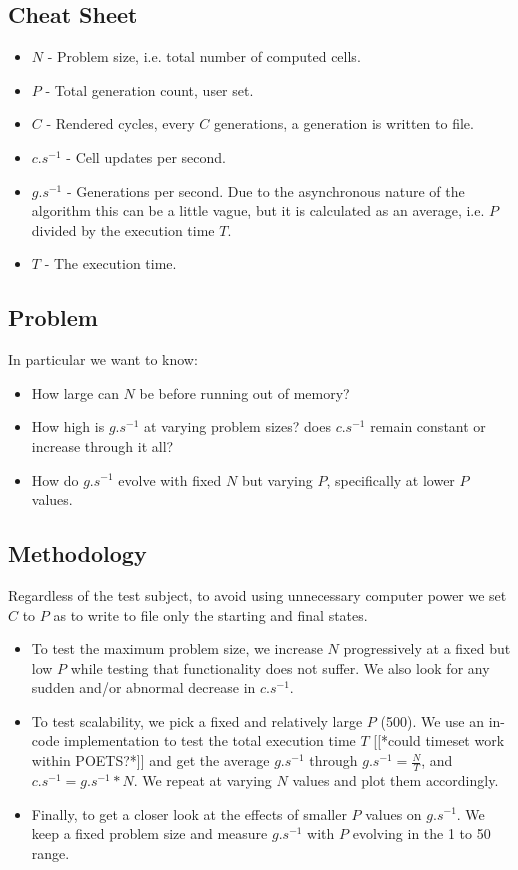 \documentclass[a4paper]{article}
\begin{document}
\subsection*{Cheat Sheet}
\begin{itemize}
    \item $N$ - Problem size, i.e. total number of computed cells.
    \item $P$ - Total generation count, user set.
    \item $C$ - Rendered cycles, every $C$ generations, a generation is written to file.
    \item $c.s^{-1}$ - Cell updates per second.
    \item $g.s^{-1}$ - Generations per second. Due to the asynchronous nature of the algorithm this can be a little vague, but it is calculated as an average, i.e. $P$ divided by the execution time $T$.
    \item $T$ - The execution time.
\end{itemize}

\subsection*{Problem}


In particular we want to know:
\begin{itemize}
    \item How large can $N$ be before running out of memory?
    \item How high is $g.s^{-1}$ at varying problem sizes? does $c.s^{-1}$ remain constant or increase through it all?
    \item How do $g.s^{-1}$ evolve with fixed $N$ but varying $P$, specifically at lower $P$ values.
\end{itemize}

\subsection*{Methodology}
Regardless of the test subject, to avoid using unnecessary computer power we set $C$ to $P$ as to write to file only the starting and final states.
\begin{itemize}
\item To test the maximum problem size, we increase $N$ progressively at a fixed but low $P$ while testing that functionality does not suffer. We also look for any sudden and/or abnormal decrease in $c.s^{-1}$.
\item To test scalability, we pick a fixed and relatively large $P$ (500). We use an in-code implementation to test the total execution time $T$ [[*could timeset work within POETS?*]] and get the average $g.s^{-1}$ through $g.s^{-1} = \frac{N}{T}$, and $c.s^{-1} = g.s^{-1} * N$. We repeat at varying $N$ values and plot them accordingly.
\item Finally, to get a closer look at the effects of smaller $P$ values on $g.s^{-1}$. We keep a fixed problem size and measure $g.s^{-1}$ with $P$ evolving in the 1 to 50 range.
\end{itemize}
\end{document}
